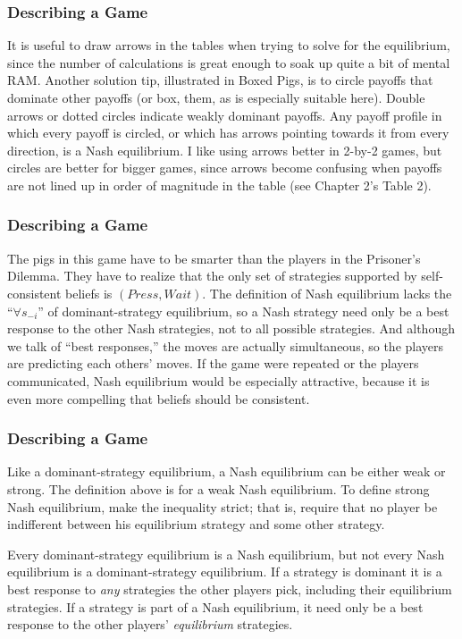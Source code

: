  \begin{frame}[fragile]\frametitle{Describing a Game}
  It is useful to draw arrows in the tables when trying to solve for the
equilibrium, since the number of calculations is great enough to soak up quite a
bit of mental RAM.  Another solution tip, illustrated in {Boxed Pigs}, is to
circle payoffs that dominate other payoffs (or box, them, as is especially
suitable here).  Double arrows or dotted circles indicate weakly dominant
payoffs.  Any payoff profile in which every payoff is circled, or which has
arrows pointing towards it from every direction, is a Nash equilibrium.  I like
using arrows better in 2-by-2 games, but circles are better for bigger games,
since arrows become confusing when payoffs are not lined up in order of
magnitude in the table (see Chapter 2's Table 2).
\end{frame}
 \begin{frame}[fragile]\frametitle{Describing a Game}
 
    The pigs in this game have to be smarter  than the players in  the
Prisoner's Dilemma. They have to realize that the only set of strategies
supported by self-consistent beliefs is $(Press, Wait)$. The definition of Nash
equilibrium lacks the  ``$\forall s_{-i}$'' of dominant-strategy equilibrium, so
a Nash strategy need only be a best response to the other Nash strategies, not
to all possible strategies. And although we talk of ``best responses,'' the
moves are actually simultaneous, so the players are predicting each others'
moves. If the game were repeated  or the players communicated, Nash equilibrium
would be especially attractive, because it is even more compelling that beliefs
should be consistent.

\end{frame}
 \begin{frame}[fragile]\frametitle{Describing a Game}
 Like a dominant-strategy equilibrium, a Nash equilibrium can be either weak or
strong. The definition above is for a weak Nash equilibrium.  To define strong
Nash equilibrium, make the inequality strict; that is, require that no player be
indifferent between his equilibrium strategy and some other strategy.

 Every dominant-strategy equilibrium is a Nash equilibrium, but not every Nash
equilibrium is a dominant-strategy equilibrium. If a strategy is dominant it is
a best response to {\it any} strategies the other players pick, including their
equilibrium strategies. If a strategy is part of a Nash equilibrium, it need
only be a best response to the other players' {\it equilibrium} strategies.

\end{frame}
